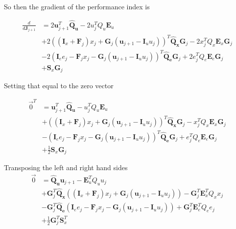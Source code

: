 \documentclass[landscape]{article}
\begin{document}
So then the gradient of the performance index is

\begin{align}
\frac{d}{d\mathbf{J}_{j+1}} 
& = 2 \mathbf{u}_{j+1}^T \mathbf{\hat{Q}_u} - 2u_j^T Q_u \mathbf{E}_u\\
& + 2 \left( \left(\mathbf{I}_x +\mathbf{F}_j \right)x_j + \mathbf{G}_j \left(\mathbf{u}_{j+1} - \mathbf{I}_u u_j \right) \right)^T \mathbf{\hat{Q}_x}\mathbf{G}_j  - 2x_j^T Q_x \mathbf{E}_x \mathbf{G}_j\\
& - 2  \left( \mathbf{I}_e e_j -\mathbf{F}_j x_j - \mathbf{G}_j \left(\mathbf{u}_{j+1} - \mathbf{I}_uu_j \right)\right)^T \mathbf{\hat{Q}_e} \mathbf{G}_j  + 2e_j^T Q_e \mathbf{E}_e \mathbf{G}_j\\
& + \mathbf{S}_x  \mathbf{G}_j
\end{align}

Setting that equal to the zero vector

\begin{align}
\vec{0}^T 
& =  \mathbf{u}_{j+1}^T \mathbf{\hat{Q}_u} - u_j^T Q_u \mathbf{E}_u\\
& +  \left( \left(\mathbf{I}_x +\mathbf{F}_j \right)x_j + \mathbf{G}_j \left(\mathbf{u}_{j+1} - \mathbf{I}_u u_j \right) \right)^T \mathbf{\hat{Q}_x}\mathbf{G}_j  - x_j^T Q_x \mathbf{E}_x \mathbf{G}_j\\
& -   \left( \mathbf{I}_e e_j -\mathbf{F}_j x_j - \mathbf{G}_j \left(\mathbf{u}_{j+1} - \mathbf{I}_uu_j \right)\right)^T \mathbf{\hat{Q}_e} \mathbf{G}_j  + e_j^T Q_e \mathbf{E}_e \mathbf{G}_j\\
& + \frac{1}{2}\mathbf{S}_x  \mathbf{G}_j
\end{align}

Transposing the left and right hand sides
\begin{align}
\vec{0}
& =  \mathbf{\hat{Q}_u} \mathbf{u}_{j+1} -  \mathbf{E}_u^T Q_u u_j\\
& +  \mathbf{G}_j^T \mathbf{\hat{Q}_x} \left( \left(\mathbf{I}_x +\mathbf{F}_j \right)x_j + \mathbf{G}_j \left(\mathbf{u}_{j+1} - \mathbf{I}_u u_j \right) \right)  -   \mathbf{G}_j^T \mathbf{E}_x^T Q_x x_j\\
& -  \mathbf{G}_j^T \mathbf{\hat{Q}_e} \left( \mathbf{I}_e e_j -\mathbf{F}_j x_j - \mathbf{G}_j \left(\mathbf{u}_{j+1} - \mathbf{I}_uu_j \right)\right)  +   \mathbf{G}_j^T \mathbf{E}_e^T Q_e e_j\\
& + \frac{1}{2} \mathbf{G}_j^T \mathbf{S}_x^T
\end{align}
\end{document}
